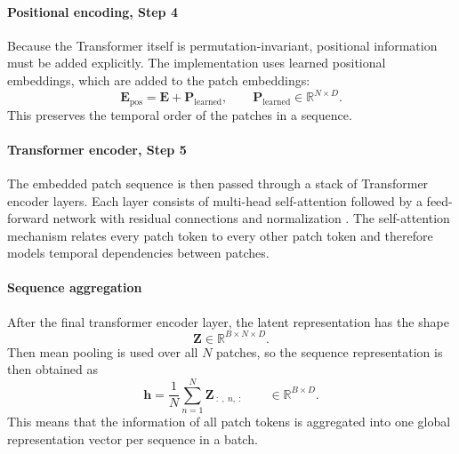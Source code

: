 \paragraph{Positional encoding,  Step 4}
Because the Transformer itself is permutation-invariant, positional information must be added explicitly. The implementation uses learned positional embeddings, which are added to the patch embeddings:
\begin{equation}
\mathbf{E}_{\text{pos}} = \mathbf{E} + \mathbf{P}_{\text{learned}},
\qquad
\mathbf{P}_{\text{learned}} \in \mathbb{R}^{N \times D}.
\end{equation}
This preserves the temporal order of the patches in a sequence.

\paragraph{Transformer encoder,  Step 5}
The embedded patch sequence is then passed through a stack of Transformer encoder layers. Each layer consists of multi-head self-attention followed by a feed-forward network with residual connections and normalization \cite{vaswaniAttentionAllYou2017}.
The self-attention mechanism relates every patch token to every other patch token and therefore models temporal dependencies between patches.

\paragraph{Sequence aggregation}
After the final transformer encoder layer, the latent representation has the shape
\begin{equation}
\mathbf{Z} \in \mathbb{R}^{B \times N \times D}.
\end{equation}
Then mean pooling is used over all $N$ patches, so the sequence representation is then obtained as
\begin{equation}
\mathbf{h}
=
\frac{1}{N}\sum_{n=1}^{N}\mathbf{Z}_{\ :\ ,\ n,\ :}
\qquad
\in
\mathbb{R}^{B \times D}.
\end{equation}
This means that the information of all patch tokens is aggregated into one global representation vector per sequence in a batch.

